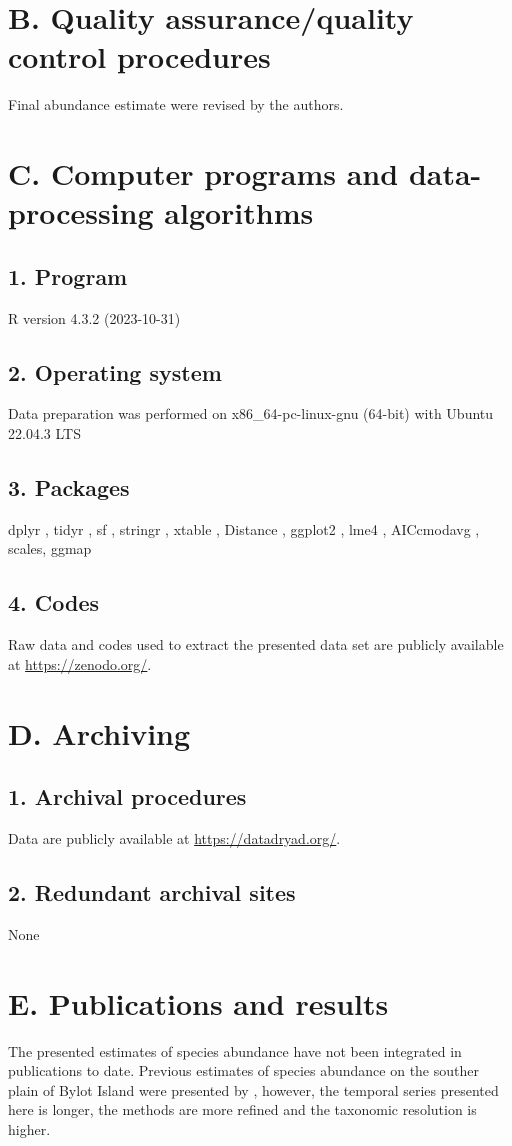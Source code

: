 \documentclass[a4paper,twoside,12pt]{article}
\begin{document}
    \section*{B. Quality assurance/quality control procedures}
    Final abundance estimate were revised by the authors.

    \section*{C. Computer programs and data-processing algorithms}
         \subsection*{1. Program} R version 4.3.2 (2023-10-31)
         \subsection*{2. Operating system} Data preparation was performed on x86\_64-pc-linux-gnu (64-bit) with Ubuntu 22.04.3 LTS
         \subsection*{3. Packages} dplyr \citep{dplyr}, tidyr \citep{tidyr}, sf \citep{sf}, stringr \citep{stringr}, xtable \citep{xtable}, Distance \citep{Distance}, ggplot2 \citep{ggplot2}, lme4 \citep{lme4}, AICcmodavg \citep{AICcmodavg}, scales\citep{scales}, ggmap \citep{ggmap}
         \subsection*{4. Codes} Raw data and codes used to extract the presented data set are publicly available at \url{https://zenodo.org/}.
                
    \section*{D. Archiving}
         \subsection*{1. Archival procedures} Data are publicly available at \url{https://datadryad.org/}.
         \subsection*{2. Redundant archival sites} None
            
       
    \section*{E. Publications and results}
The presented estimates of species abundance have not been integrated in publications to date. Previous estimates of species abundance on the souther plain of Bylot Island were presented by \citet{legagneux2012}, however, the temporal series presented here is longer, the methods are more refined and the taxonomic resolution is higher.
   
\end{document}
